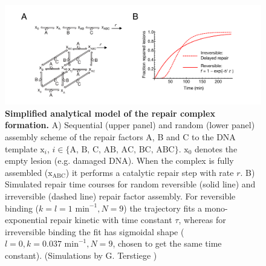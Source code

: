 \begin{figure}[t]
\begin{center}
\includegraphics[width=1\textwidth]{Abbildungen/figure2_5_2.pdf}
\caption{\textbf{Simplified analytical model of the repair complex formation.} A) Sequential (upper panel) and random (lower panel) assembly scheme of the repair factors A, B and C to the DNA template $\text{x}_i$, $i \in \{\text{A, B, C, AB, AC, BC, ABC}\}$. $\text{x}_0$ denotes the empty lesion (e.g. damaged DNA). When the complex is fully assembled ($\text{x}_{\text{ABC}}$) it performs a catalytic repair step with rate $r$. B) Simulated repair time courses for random reversible (solid line) and irreversible (dashed line) repair factor assembly. For reversible binding ($k=l= \text{1 min}^{-1}, N=\text{9}$) the trajectory fits a mono-exponential repair kinetic with time constant $\tau$, whereas for irreversible binding the fit has sigmoidal shape ($l=\text{0}, k=\text{0.037 min}^{-1}, N=\text{9}$, chosen to get the same time constant). (Simulations by G. Terstiege \cite{Terstiege2010})}
\label{fig:reactionTiming}
\end{center}
\end{figure}


